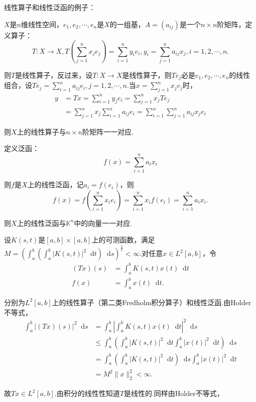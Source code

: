 \documentclass[bwprint, withoutpreface]{cumcmthesis}
\newcommand*{\dif}{\mathop{}\!\mathrm{d}}
\newcommand*{\nnorm}[2]{\| #1 \|_{#2}}
\begin{document}
线性算子和线性泛函的例子：

$X$是$n$维线性空间，$e_1, e_2, \cdots, e_n$是$X$的一组基，$A = (a_{ij})$是一个$n \times n$阶矩阵，定义算子：\[T:X \to X, T(\sum_{j = 1}^{n}{x_j e_j}) = \sum_{i = 1}^{n}{y_i e_i}, y_i = \sum_{j = 1}^{n}{a_{ij} x_j}, i = 1, 2, \cdots, n.\]

则$T$是线性算子，反过来，设$T:X \to X$是线性算子，则$Te_j$必是$e_1,e_2,\cdots,e_n$的线性组合，设$Te_j = \sum_{i = 1}^{n}{a_{ij} e_i}, j = 1, 2, \cdots, n.$当$x = \sum_{j = 1}^{n}{x_j e_j}$时，
\begin{align*}
	y & = Tx = \sum_{i = 1}^{n}{y_j e_i} = \sum_{j = 1}^{n}{x_j T e_j} \\
	  & = \sum_{j = 1}^{n}{x_j} \sum_{i = 1}^{n}{a_{ij}e_i} = \sum_{i = 1}^{n}{\sum_{j = 1}^{n}{a_{ij} x_j } e_i }
\end{align*}

则$X$上的线性算子与$n \times n$阶矩阵一一对应.

定义泛函：\[f(x) = \sum_{i = 1}^{n}{a_i x_i}\]

则$f$是$X$上的线性泛函，记$a_i = f(e_i)$，则\[f(x) = f(\sum_{i = 1}^{n}{x_i e_i}) = \sum_{i = 1}^{n}{x_i}{f(e_i)} = \sum_{i = 1}^{n}{a_i x_i}.\]

则$X$上的线性泛函与$\mathbb{K}^n$中的向量一一对应.

设$K(s, t)$是$[a, b] \times [a, b]$上的可测函数，满足$M = (\int_{a}^{b}(\int_{a}^{b}|K(s, t)|^2 \dif t) \dif s)^\frac{1}{2} < \infty$.对任意$x \in L^2[a, b]$，令
\begin{align*}
	(Tx) (s) & = \int_{a}^{b} K(s, t) x(t) \dif t \\
	f(x)	 & = \int_{a}^{b} x(t) \dif t.
\end{align*}

分别为$L^2[a, b]$上的线性算子（第二类Fredholm积分算子）和线性泛函.由Holder不等式，
\begin{align*}
	\int_{a}^{b} |(Tx) (s)|^2 \dif s & = \int_{a}^{b}|\int_{a}^{b} K(s, t) x(t) \dif t|^2 \dif s \\
									 & \leqslant \int_{a}^{b}(\int_{a}^{b}|K(s, t)|^2 \dif t \int_{a}^{b} |x(t)|^2 \dif t) \dif s \\
									 & = \int_{a}^{b}(\int_{a}^{b}|K(s, t)|^2 \dif t) \dif s \int_{a}^{b} |x(t)|^2 \dif t \\
									 & = M^2 \nnorm{x}{2}^2 < \infty.
\end{align*}

故$Tx \in L^2[a, b]$.由积分的线性性知道$T$是线性的.同样由Holder不等式，
\end{document}
